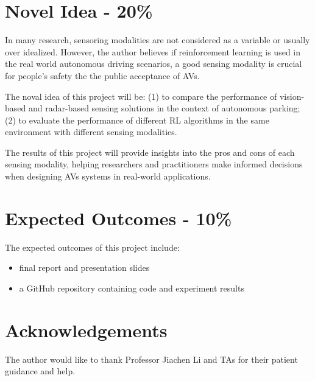 \documentclass{article}
\begin{document}
\section{Novel Idea - 20\%}
In many research, sensoring modalities are not considered as a variable or usually over idealized. However, the author believes if reinforcement learning is used in the real world autonomous driving scenarios, a good sensing modality is crucial for people's safety the the public acceptance of AVs.

The noval idea of this project will be: (1) to compare the performance of vision-based and radar-based sensing solutions in the context of autonomous parking; (2) to evaluate the performance of different RL algorithms in the same environment with different sensing modalities.

The results of this project will provide insights into the pros and cons of each sensing modality, helping researchers and practitioners make informed decisions when designing AVs systems in real-world applications.

\section{Expected Outcomes - 10\%}

The expected outcomes of this project include:
\begin{itemize}
    \item final report and presentation slides
    \item a GitHub repository containing code and experiment results
\end{itemize}

\section*{Acknowledgements}
The author would like to thank Professor Jiachen Li and TAs for their patient guidance and help.





\end{document}
